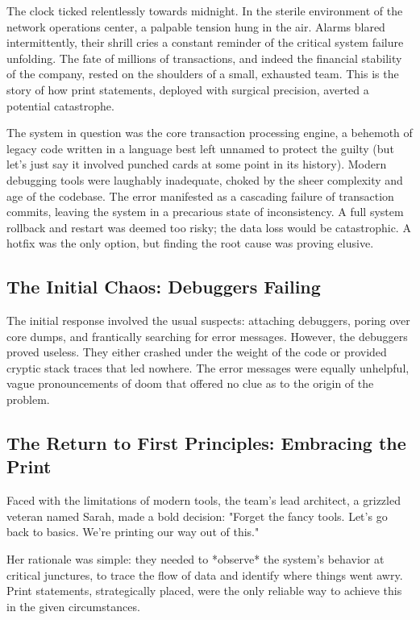 \documentclass{article}
\begin{document}
{{{{The clock ticked relentlessly towards midnight. In the sterile environment of the network operations center, a palpable tension hung in the air. Alarms blared intermittently, their shrill cries a constant reminder of the critical system failure unfolding. The fate of millions of transactions, and indeed the financial stability of the company, rested on the shoulders of a small, exhausted team. This is the story of how print statements, deployed with surgical precision, averted a potential catastrophe.

The system in question was the core transaction processing engine, a behemoth of legacy code written in a language best left unnamed to protect the guilty (but let's just say it involved punched cards at some point in its history). Modern debugging tools were laughably inadequate, choked by the sheer complexity and age of the codebase. The error manifested as a cascading failure of transaction commits, leaving the system in a precarious state of inconsistency. A full system rollback and restart was deemed too risky; the data loss would be catastrophic. A hotfix was the only option, but finding the root cause was proving elusive.

\subsection*{The Initial Chaos: Debuggers Failing}

The initial response involved the usual suspects: attaching debuggers, poring over core dumps, and frantically searching for error messages. However, the debuggers proved useless. They either crashed under the weight of the code or provided cryptic stack traces that led nowhere. The error messages were equally unhelpful, vague pronouncements of doom that offered no clue as to the origin of the problem.

\subsection*{The Return to First Principles: Embracing the Print}

Faced with the limitations of modern tools, the team's lead architect, a grizzled veteran named Sarah, made a bold decision: "Forget the fancy tools. Let's go back to basics. We're printing our way out of this."

Her rationale was simple: they needed to *observe* the system's behavior at critical junctures, to trace the flow of data and identify where things went awry. Print statements, strategically placed, were the only reliable way to achieve this in the given circumstances.

}}}}
\end{document}

